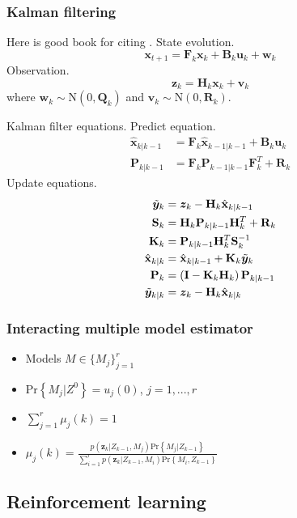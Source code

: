 \documentclass[11pt,a4paper]{article}
\newcommand{\inv}[1]{#1^{-1}}
\renewcommand{\Pr}[1]{\text{Pr}\left\{ #1 \right\}}
\newcommand{\xprior}{\hat{\vec{x}}_{k|k-1}}
\newcommand{\xpost}{\hat{\vec{x}}_{k|k}}
\newcommand{\xlast}{\hat{\vec{x}}_{k-1|k-1}}
\newcommand{\priorpcov}{\vec{P}_{k|k-1}}
\newcommand{\postpcov}{\vec{P}_{k}}
\newcommand{\lastpcov}{\vec{P}_{k-1|k-1}}
\newcommand{\prefitinnov}{\Tilde{\bm{y}}_k}
\newcommand{\postfitinnov}{\Tilde{\bm{y}}_{k|k}}
\renewcommand{\vec}[1]{\mathbf{#1}}
\newcommand{\x}{\bm{x}_k}
\newcommand{\z}{\bm{z}_k}
\newcommand{\stmodel}{\vec{F}_k}
\newcommand{\cimodel}{\vec{B}_k}
\newcommand{\cinput}{\vec{u}_k}
\newcommand{\pnoise}{\vec{w}_k}
\newcommand{\omodel}{\vec{H}_k}
\newcommand{\onoise}{\vec{v}_k}
\newcommand{\ocov}{\vec{R}_k}
\newcommand{\pcov}{\vec{Q}_k}
\newcommand{\innocov}{\vec{S}_k}
\newcommand{\eye}{\vec{I}}
\newcommand{\gain}{\vec{K}_k}
\newcommand{\normal}[2]{\mathrm{N}\left(#1, #2 \right)}
\begin{document}
\subsubsection{Kalman filtering}

Here is good book for citing \cite{Krishnamurthy2016}.
State evolution.
\begin{equation}
    \bm{x}_{t+1} = \stmodel \x + \cimodel \cinput + \pnoise
\end{equation}
Observation.
\begin{equation}
    \z = \omodel \x + \onoise
\end{equation}
where $\pnoise \sim \normal{0}{\pcov}$ and $\onoise \sim \normal{0}{\ocov}$.

Kalman filter equations. Predict equation.
\begin{align}
    \xprior &= \stmodel \xlast + \cimodel \cinput \\
    \priorpcov &= \stmodel \lastpcov \stmodel^T + \ocov
\end{align}
Update equations.
\begin{align}
    \prefitinnov &= \z - \omodel \xprior \\
    \innocov &= \omodel \priorpcov \omodel^T + \ocov \\
    \gain &= \priorpcov \omodel^T \inv{\innocov} \\
    \xpost &= \xprior + \gain \prefitinnov \\
    \postpcov &= \left( \eye - \gain \omodel \right) \priorpcov \\
    \postfitinnov &= \z - \omodel \xpost
\end{align}

\subsubsection{Interacting multiple model estimator}

\begin{itemize}
    \item Models $M \in \{ M_j \}_{j=1}^r$
    \item $\Pr{M_j | Z^0} = u_j(0)$, $j=1,...,r$
    \item $\sum_{j=1}^r \mu_j(k) = 1$
    \item $\mu_j(k) = \frac{p\left(\z | Z_{k-1} , M_j \right) \Pr{M_j|Z_{k-1}}}{\sum_{i=1}^r p\left(\z | Z_{k-1} , M_i \right)\Pr{M_i, Z_{k-1}}} $
\end{itemize}

\subsection{Reinforcement learning}
\end{document}

